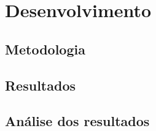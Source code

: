 \section{Desenvolvimento}

\subsection{Metodologia}

\subsection{Resultados}

\subsection{Análise dos resultados}